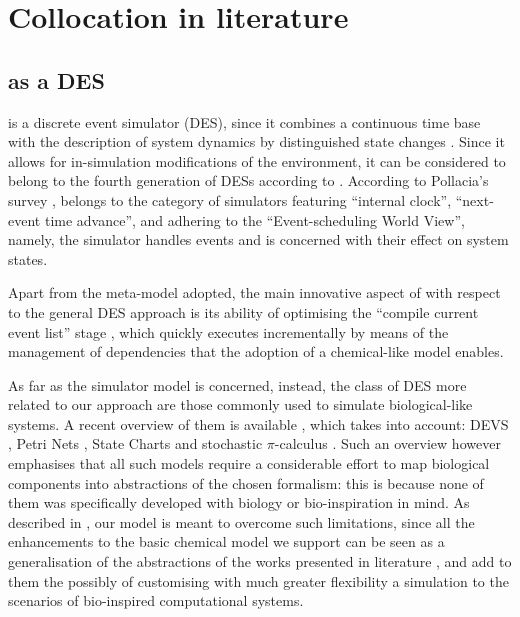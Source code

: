\documentclass[12pt,a4paper,twoside,openright]{book}
\begin{document}
\chapter{Collocation in literature}

\section{\alchemist{} as a DES}

\alchemist{} is a discrete event simulator (DES), since it combines a continuous time base with the description of system dynamics by distinguished state changes \cite{Zeigler2000}.
%
Since it allows for in-simulation modifications of the environment, it can be considered to belong to the fourth generation of DESs according to \cite{BabulakIJOE2008}.
%
According to Pollacia's survey \cite{Pollacia89}, \alchemist{} belongs to the category of simulators featuring ``internal clock'', ``next-event time advance'', and adhering to the ``Event-scheduling World View'', namely, the simulator handles events and is concerned with their effect on system states.

Apart from the meta-model adopted, the main innovative aspect of \alchemist{} with respect to the general DES approach is its ability of optimising the ``compile current event list'' stage \cite{Pollacia89}, which \alchemist{} quickly executes incrementally by means of the management of dependencies that the adoption of a chemical-like model enables.

As far as the simulator model is concerned, instead, the class of DES more related to our approach are those commonly used to simulate biological-like systems.
%
A recent overview of them is available \cite{EwaldJOS2007}, which takes into account: DEVS \cite{zeigler1984}, Petri Nets \cite{murata1989}, State Charts \cite{Harel1987} and stochastic $\pi$-calculus \cite{Priami1995}.
%
Such an overview however emphasises that all such models require a considerable effort to map biological components into abstractions of the chosen formalism: this is because none of them was specifically developed with biology or bio-inspiration in mind.
%
As described in , our model is meant to overcome such limitations, since all the enhancements to the basic chemical model we support can be seen as a generalisation of the abstractions of the works presented in literature \cite{EwaldJOS2007}, and add to them the possibly of customising with much greater flexibility a simulation to the scenarios of bio-inspired computational systems.
\end{document}
